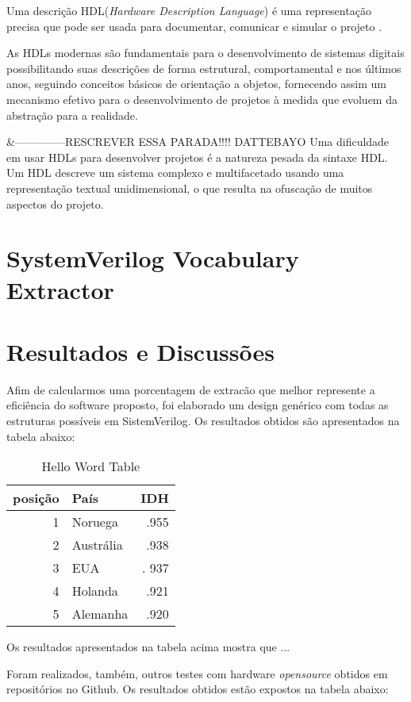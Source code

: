 \documentclass[12pt, twocolumn, a4paper]{article}
\begin{document}
\quad Uma descrição HDL(\textit{Hardware Description Language}) é uma representação precisa que pode ser usada para documentar, comunicar e simular o projeto \cite{Miller-Karlow}.

As HDLs modernas são fundamentais para o desenvolvimento de sistemas digitais possibilitando suas descrições de forma estrutural, comportamental e nos últimos anos, seguindo conceitos básicos de orientação a objetos, fornecendo assim um mecanismo efetivo para o desenvolvimento de projetos à medida que evoluem da abstração para a realidade.

&--------------RESCREVER ESSA PARADA!!!! DATTEBAYO
Uma dificuldade em usar HDLs para desenvolver projetos é a natureza pesada da sintaxe HDL. Um HDL descreve um sistema complexo e multifacetado usando uma representação textual unidimensional, o que resulta na ofuscação de muitos aspectos do projeto.
	\section{SystemVerilog Vocabulary Extractor}
	\section{Resultados e Discussões}
\quad Afim de calcularmos uma porcentagem de extracão que melhor represente a eficiência do software proposto, foi elaborado um design genérico com todas as estruturas possíveis em SistemVerilog. Os resultados obtidos são apresentados na tabela abaixo:

\begin{table}[h]
\centering
\caption{Hello Word Table}
	\begin{tabular}{r|l|r}
	\hline
	posição & País & IDH\\
	\hline
	1 & Noruega        & .955 \\
	\hline
	2 & Austrália 	   & .938 \\
	\hline
	3 & EUA            &. 937 \\
	\hline
	4 & Holanda        & .921 \\
	\hline
	5 & Alemanha       & .920 \\
	\hline
	
	\end{tabular}

\end{table}

\quad Os resultados apresentados na tabela acima mostra que ...

	Foram realizados, também, outros testes com hardware \textit{opensource} obtidos em repositórios no Github. Os resultados obtidos estão expostos na tabela abaixo:
	
\end{document}
